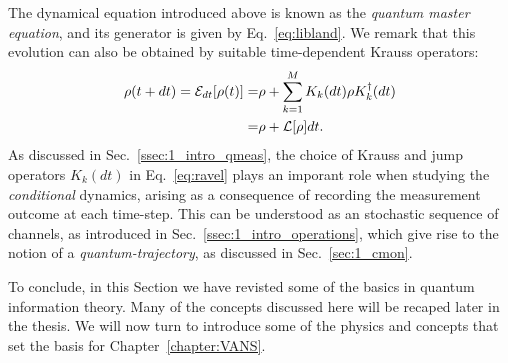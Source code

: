 The dynamical equation introduced above is known as the \textit{quantum master equation}, and its generator is given by Eq.~\ref{eq:libland}. We remark that this evolution can also be obtained by suitable time-dependent Krauss operators:
\begin{align}\label{eq:ravel}
\rho(t+dt) = \mathcal{E}_{dt}[\rho(t)] =& \rho + \sum_{k=1}^M K_k(dt) \rho K^\dagger _k(dt) \\
=& \rho + \mathcal{L}[\rho] dt.
\end{align}
As discussed in Sec.~\ref{ssec:1_intro_qmeas}, the choice of Krauss and jump operators $K_k(dt)$ in Eq.~\ref{eq:ravel} plays an imporant role when studying the \textit{conditional} dynamics, arising as a consequence of recording the measurement outcome at each time-step. This can be understood as an stochastic sequence of channels, as introduced in Sec.~\ref{ssec:1_intro_operations}, which give rise to the notion of a \textit{quantum-trajectory}, as discussed in Sec.~\ref{sec:1_cmon}.

\vspace{2cm}
To conclude, in this Section we have revisted some of the basics in quantum information theory. Many of the concepts discussed here will be recaped later in the thesis. We will now turn to introduce some of the physics and concepts that set the basis for Chapter~\ref{chapter:VANS}.
